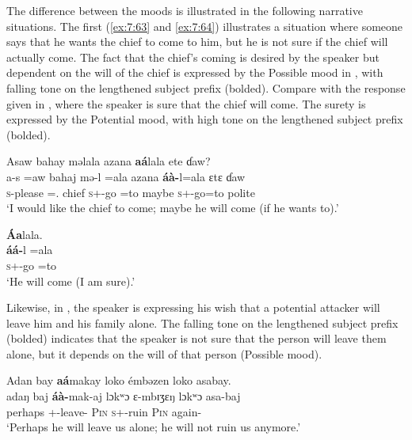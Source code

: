 The difference between the moods is illustrated in the following narrative situations. The first (\ref{ex:7:63} and \ref{ex:7:64}) illustrates a situation where someone says that he wants the chief to come to him, but he is not sure if the chief will actually come. The fact that the chief’s coming is desired by the speaker but dependent on the will of the chief is expressed by the Possible mood in , with falling tone on the lengthened subject prefix (bolded). Compare with the response given in , where the speaker is sure that the chief will come. The surety is expressed by the Potential mood, with high tone on the lengthened subject prefix (bolded). 

\ea\label{ex:7:63}
Asaw  bahay  məlala azana  \textbf{aá}lala  ete  ɗaw?\\
\gll  a-s  =aw  bahaj  mə-l    =ala azana  \textbf{áà-}l=ala  ɛtɛ  ɗaw\\
      \textsc{s}-please  ={\oneS}.{\IO}  chief  \textsc{s}+{\HOR}-go  =to  maybe  \textsc{s}+{\PBL}{}-go=to  polite  {\QUEST}\\
\glt  ‘I would like the chief to come; maybe he will come (if he wants to).’\\
\z  

\ea\label{ex:7:64}
\textbf{Áa}lala.\\
\gll \textbf{áá-}l    =ala\\
      \textsc{s}+{\POT}-go  =to\\
\glt  ‘He will come (I am sure).’\\
\z 

Likewise, in , the speaker is expressing his wish that a potential attacker will leave him and his family alone. The falling tone on the lengthened subject prefix (bolded) indicates that the speaker is not sure that the person will leave them alone, but it depends on the will of that person (Possible mood). 

\ea\label{ex:7:65}
Adan  bay  \textbf{aá}makay  loko  émbəzen  loko  asabay.\\
\gll  adaŋ  baj  \textbf{áà-}mak-aj    lɔkʷɔ  ɛ{}-mbɪʒɛŋ  lɔkʷɔ  asa-baj\\
      perhaps  {\NEG}  {\twoS}+{\PBL}{}-leave{}-{\CL}  \textsc{Pin}  \textsc{s}+{\IFV}-ruin  \textsc{Pin}  again-{\NEG}\\
\glt  ‘Perhaps he will leave us alone; he will not ruin us anymore.’\\
\z 

